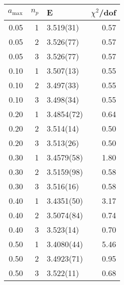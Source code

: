 \begin{tabular}{rrlr}
\hline
   $a_\textrm{max}$ &   $n_p$ & E          &   $\chi^2$/dof \\
\hline
               0.05 &       1 & 3.519(31)  &           0.57 \\
               0.05 &       2 & 3.526(77)  &           0.57 \\
               0.05 &       3 & 3.526(77)  &           0.57 \\
               0.10 &       1 & 3.507(13)  &           0.55 \\
               0.10 &       2 & 3.497(33)  &           0.55 \\
               0.10 &       3 & 3.498(34)  &           0.55 \\
               0.20 &       1 & 3.4854(72) &           0.64 \\
               0.20 &       2 & 3.514(14)  &           0.50 \\
               0.20 &       3 & 3.513(26)  &           0.50 \\
               0.30 &       1 & 3.4579(58) &           1.80 \\
               0.30 &       2 & 3.5159(98) &           0.58 \\
               0.30 &       3 & 3.516(16)  &           0.58 \\
               0.40 &       1 & 3.4351(50) &           3.17 \\
               0.40 &       2 & 3.5074(84) &           0.74 \\
               0.40 &       3 & 3.523(14)  &           0.70 \\
               0.50 &       1 & 3.4080(44) &           5.46 \\
               0.50 &       2 & 3.4923(71) &           0.95 \\
               0.50 &       3 & 3.522(11)  &           0.68 \\
\hline
\end{tabular}
